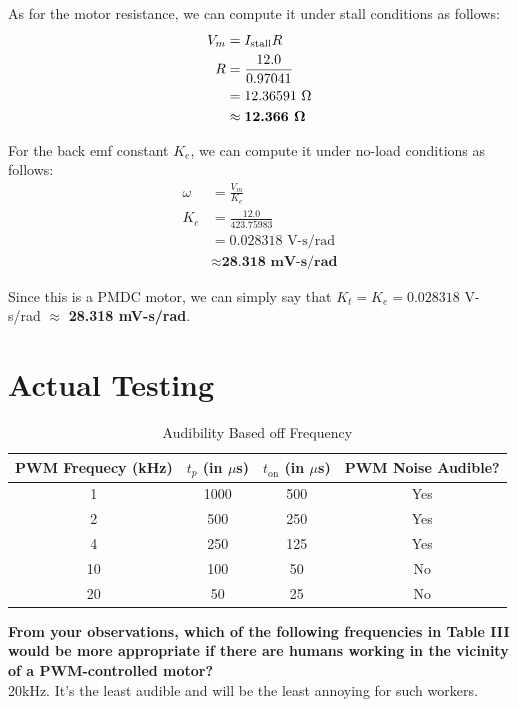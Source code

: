 \documentclass[a4paper,12pt,oneside, tikz]{book}
\begin{document}
As for the motor resistance, we can compute it under stall conditions as follows:
\begin{align*}
    V_m &= I_\text{stall} R \\
    R &= \frac{12.0}{0.97041} \\
    &= 12.36591\text{ }\Omega \\
    &\approx \textbf{12.366 }\bf{\Omega}
\end{align*}

For the back emf constant $K_e$, we can compute it under no-load conditions as follows:
\begin{align*}
    \omega &= \frac{V_m}{K_e} \\
    K_e &= \frac{12.0}{423.75983} \\
    &= 0.028318\text{ V-s/rad} \\
    &\approx \textbf{28.318 mV-s/rad}
\end{align*}

Since this is a PMDC motor, we can simply say that $K_t = K_e = 0.028318$ V-s/rad $\approx$ \textbf{28.318 mV-s/rad}.

\chapter{Actual Testing}

\begin{table}[H]
    \centering
    \begin{tabular}{|c|c|c|c|}
     \hline PWM Frequecy (kHz) & $t_p$ (in $\mu$s) & $t_\text{on}$ (in $\mu$s) & PWM Noise Audible?  \\
     \hline 1 & 1000 & 500 & Yes \\
     2 & 500 & 250  & Yes \\
     4 & 250 & 125 & Yes \\
     10 & 100 & 50  & No \\
     20 & 50 & 25 & No \\
     \hline
    \end{tabular}
    \caption{Audibility Based off Frequency}
    \label{tab:audibility}
\end{table}

\begin{tcolorbox}
    \textbf{From your observations, which of the following frequencies in Table III would be more appropriate if there are humans working in the vicinity of a PWM-controlled motor?} \\
    20kHz. It's the least audible and will be the least annoying for such workers.
\end{tcolorbox}
\end{document}

